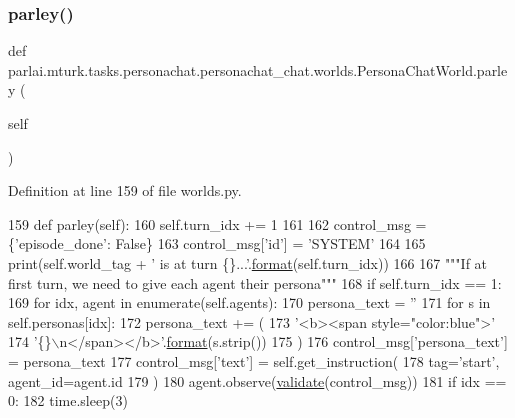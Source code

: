 \subsubsection{\texorpdfstring{parley()}{parley()}}
{\footnotesize\ttfamily def parlai.\+mturk.\+tasks.\+personachat.\+personachat\+\_\+chat.\+worlds.\+Persona\+Chat\+World.\+parley (\begin{DoxyParamCaption}\item[{}]{self }\end{DoxyParamCaption})}



Definition at line 159 of file worlds.\+py.


\begin{DoxyCode}
159     \textcolor{keyword}{def }parley(self):
160         self.turn\_idx += 1
161 
162         control\_msg = \{\textcolor{stringliteral}{'episode\_done'}: \textcolor{keyword}{False}\}
163         control\_msg[\textcolor{stringliteral}{'id'}] = \textcolor{stringliteral}{'SYSTEM'}
164 
165         print(self.world\_tag + \textcolor{stringliteral}{' is at turn \{\}...'}.\hyperlink{namespaceparlai_1_1chat__service_1_1services_1_1messenger_1_1shared__utils_a32e2e2022b824fbaf80c747160b52a76}{format}(self.turn\_idx))
166 
167         \textcolor{stringliteral}{"""If at first turn, we need to give each agent their persona"""}
168         \textcolor{keywordflow}{if} self.turn\_idx == 1:
169             \textcolor{keywordflow}{for} idx, agent \textcolor{keywordflow}{in} enumerate(self.agents):
170                 persona\_text = \textcolor{stringliteral}{''}
171                 \textcolor{keywordflow}{for} s \textcolor{keywordflow}{in} self.personas[idx]:
172                     persona\_text += (
173                         \textcolor{stringliteral}{'<b><span style="color:blue">'}
174                         \textcolor{stringliteral}{'\{\}\(\backslash\)n</span></b>'}.\hyperlink{namespaceparlai_1_1chat__service_1_1services_1_1messenger_1_1shared__utils_a32e2e2022b824fbaf80c747160b52a76}{format}(s.strip())
175                     )
176                 control\_msg[\textcolor{stringliteral}{'persona\_text'}] = persona\_text
177                 control\_msg[\textcolor{stringliteral}{'text'}] = self.get\_instruction(
178                     tag=\textcolor{stringliteral}{'start'}, agent\_id=agent.id
179                 )
180                 agent.observe(\hyperlink{namespaceparlai_1_1core_1_1worlds_afc3fad603b7bce41dbdc9cdc04a9c794}{validate}(control\_msg))
181                 \textcolor{keywordflow}{if} idx == 0:
182                     time.sleep(3)

\end{DoxyCode}
